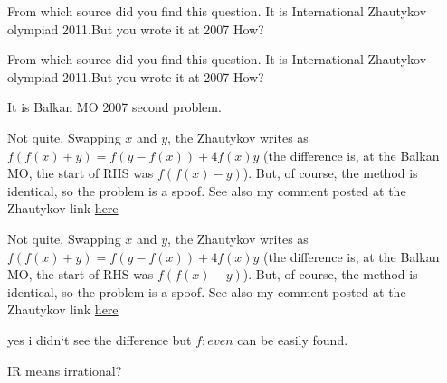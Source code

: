\begin{mysolution}
	From which source did you find this question. It is International Zhautykov olympiad 2011.But you wrote it at 2007 How?
\end{mysolution}



\begin{mysolution}
	\begin{tcolorbox}From which source did you find this question. It is International Zhautykov olympiad 2011.But you wrote it at 2007 How?\end{tcolorbox}
It is Balkan MO 2007 second problem.
\end{mysolution}



\begin{mysolution}
	Not quite. Swapping $x$ and $y$, the Zhautykov writes as $f(f(x) + y) = f(y - f(x)) + 4f(x)y$ (the difference is, at the Balkan MO, the start of RHS was $f(f(x) - y)$). But, of course, the method is identical, so the problem is a spoof. See also my comment posted at the Zhautykov link \href{https://artofproblemsolving.com/community/c6h386820p2148157}{here}
\end{mysolution}



\begin{mysolution}
	\begin{tcolorbox}	Not quite. Swapping $x$ and $y$, the Zhautykov writes as $f(f(x) + y) = f(y - f(x)) + 4f(x)y$ (the difference is, at the Balkan MO, the start of RHS was $f(f(x) - y)$). But, of course, the method is identical, so the problem is a spoof. See also my comment posted at the Zhautykov link \href{https://artofproblemsolving.com/community/c6h386820p2148157}{here}\end{tcolorbox}
yes i didn`t see the difference but $f:even$ can be easily found.
\end{mysolution}



\begin{mysolution}
	IR means irrational?
\end{mysolution}



